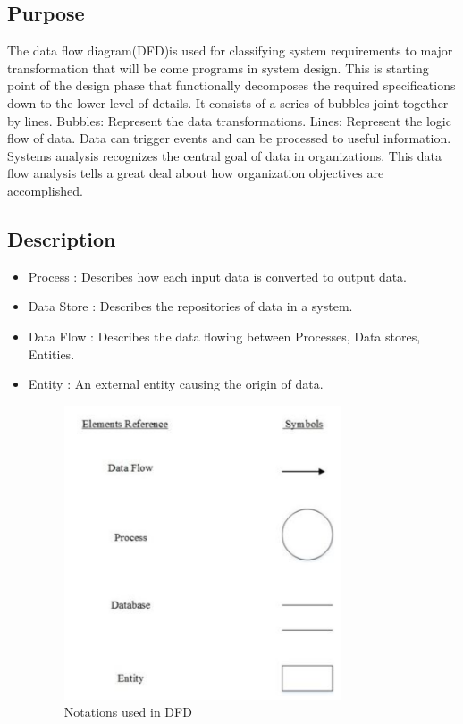 \documentclass[12pt,a4paper,oneside]{report}
\begin{document}
{\subsection {Purpose} 
\par The data ﬂow diagram(DFD)is used for classifying system requirements to major transformation that will be come programs in system design. This is starting point of the design phase that functionally decomposes the required specifications down to the lower level of details. It consists of a series of bubbles joint together by lines. Bubbles: Represent the data transformations. Lines: Represent the logic ﬂow of data. Data can trigger events and can be processed to useful information. Systems analysis recognizes the central goal of data in organizations. This data flow analysis tells a great deal about how organization objectives are accomplished.


\subsection{Description}
\begin{itemize}
\item  Process : Describes how each input data is converted to output data.
\item  Data Store : Describes the repositories of data in a system.
\item   Data Flow : Describes the data ﬂowing between Processes, Data stores, Entities.
\item   Entity : An external entity causing the origin of data.
\begin{figure}[h]
\begin{center}
\includegraphics[scale=1]{dfd.png}
\caption{Notations used in  DFD}
\label{Notations used in  DFD}
\end{center}
\end{figure}
\end{itemize}
\newpage


}
\end{document}
